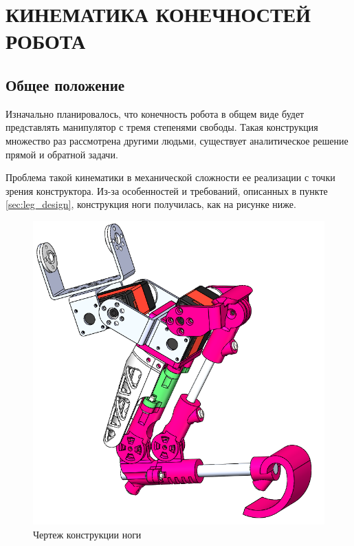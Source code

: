 \chapter{\MakeUppercase{Кинематика конечностей робота}}
\section{Общее положение} \label{sec:kin_general}
Изначально планировалось, что конечность робота в общем виде будет представлять манипулятор с тремя степенями свободы. Такая конструкция множество раз рассмотрена другими людьми, существует аналитическое решение прямой и обратной задачи.

Проблема такой кинематики в механической сложности ее реализации с точки зрения конструктора. Из-за особенностей и требований, описанных в пункте \ref{sec:leg_design}, конструкция ноги получилась, как на рисунке ниже.
\begin{figure}[h]
    \centering
    \includegraphics[scale=0.5]{chapter_kinematics/figure2.png}
    \caption{Чертеж конструкции ноги}
    \label{}
\end{figure}


